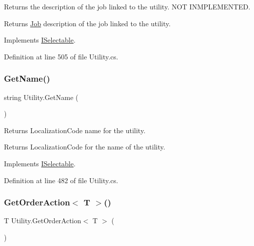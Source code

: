 Returns the description of the job linked to the utility. N\+OT I\+N\+M\+P\+L\+E\+M\+E\+N\+T\+ED. 

\begin{DoxyReturn}{Returns}
\hyperlink{class_job}{Job} description of the job linked to the utility.
\end{DoxyReturn}


Implements \hyperlink{interface_i_selectable_a4d0f9fa51a3d70a7fbcbb39e126e4c73}{I\+Selectable}.



Definition at line 505 of file Utility.\+cs.

\mbox{\label{class_utility_a3c5c2a1968dfcf083e9b1fa9b843184d}} 
\subsubsection{\texorpdfstring{Get\+Name()}{GetName()}}
{\footnotesize\ttfamily string Utility.\+Get\+Name (\begin{DoxyParamCaption}{ }\end{DoxyParamCaption})}



Returns Localization\+Code name for the utility. 

\begin{DoxyReturn}{Returns}
Localization\+Code for the name of the utility.
\end{DoxyReturn}


Implements \hyperlink{interface_i_selectable_af676ba50e2cd5839438d3092743a79da}{I\+Selectable}.



Definition at line 482 of file Utility.\+cs.

\mbox{\label{class_utility_a9b4b77e3b110b715f56d5a06824f691a}} 
\subsubsection{\texorpdfstring{Get\+Order\+Action$<$ T $>$()}{GetOrderAction< T >()}}
{\footnotesize\ttfamily T Utility.\+Get\+Order\+Action$<$ T $>$ (\begin{DoxyParamCaption}{ }\end{DoxyParamCaption})}

